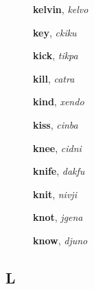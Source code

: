 \documentclass[12pt]{book}
\begin{document}
\begin{description}

\item[ ] \textbf{kelvin}, \textit{kelvo}

\item[ ] \textbf{key}, \textit{ckiku}

\item[ ] \textbf{kick}, \textit{tikpa}

\item[ ] \textbf{kill}, \textit{catra}

\item[ ] \textbf{kind}, \textit{xendo}

\item[ ] \textbf{kiss}, \textit{cinba}

\item[ ] \textbf{knee}, \textit{cidni}

\item[ ] \textbf{knife}, \textit{dakfu}

\item[ ] \textbf{knit}, \textit{nivji}

\item[ ] \textbf{knot}, \textit{jgena}

\item[ ] \textbf{know}, \textit{djuno}



\end{description}



\subsection{L} %
\end{document}

